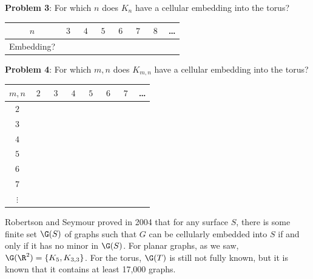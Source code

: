 \documentclass{amsart}
\begin{document}
	\noindent \textbf{Problem 3}: For which $n$ does $K_n$ have a cellular embedding into the torus?\\
	
	\begin{center}
	\begin{tabular}{|c|c|c|c|c|c|c|c|}
		\hline 
		$n$ & $\;3\;$ & $\;4\;$ & $\;5\;$ & $\;6\;$ & $\;7\;$ & $\;8\;$ & \dots \\
		\hline 
		Embedding? & & & & & & & \\[3pt]
		\hline 
	\end{tabular}
	\end{center}
	\vspace{0.3cm}
	
	\noindent \textbf{Problem 4}: For which $m,n$ does $K_{m,n}$ have a cellular embedding into the torus?\\

	\begin{center}
		\begin{tabular}{|c|c|c|c|c|c|c|c|}
			\hline 
			$m,n$ & $\; 2\; $ & $\;3\;$ & $\;4\;$ & $\;5\;$ & $\;6\;$ & $\;7\;$ & \dots \\[3pt]
			\hline 
			$2$ & & & & & & & \\[3pt]
			\hline 
			$3$ & & & & & & & \\[3pt]
			\hline 
			$4$ & & & & & & & \\[3pt]
			\hline 
			$5$ & & & & & & & \\[3pt]
			\hline 
			$6$ & & & & & & & \\[3pt]
			\hline 
			$7$ & & & & & & & \\[3pt]
			\hline 
			$\vdots$ & & & & & & & \\
			\hline 
		\end{tabular}
	\end{center}
	
	\vspace{0.3cm}
	
	Robertson and Seymour proved in 2004 that for any surface $S$, there is some finite set $\G(S)$ of graphs such that $G$ can be cellularly embedded into $S$ if and only if it has no minor in $\G(S)$. For planar graphs, as we saw, $\G(\R^2)=\{K_5,K_{3,3}\}$. For the torus, $\G(T)$ is still not fully known, but it is known that it contains at least 17,000 graphs.
	
\end{document}
